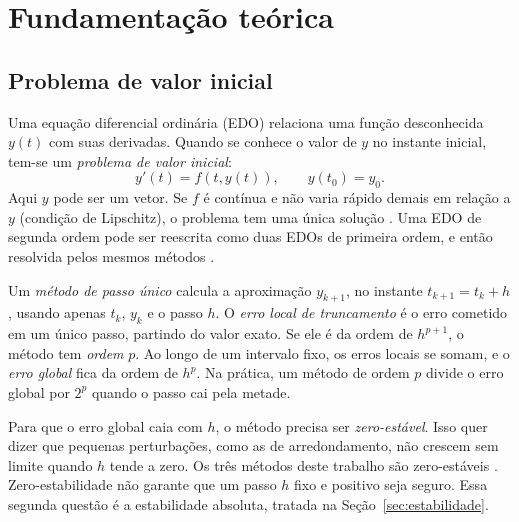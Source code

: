 \section{Fundamentação teórica}
\label{sec:teoria}

\subsection{Problema de valor inicial}

Uma equação diferencial ordinária (EDO) relaciona uma função desconhecida \(y(t)\) com suas derivadas. Quando se conhece o valor de \(y\) no instante inicial, tem-se um \emph{problema de valor inicial}:
\begin{equation}
y'(t) = f(t,y(t)), \qquad y(t_0)=y_0.
\label{eq:pvi}
\end{equation}
Aqui \(y\) pode ser um vetor. Se \(f\) é contínua e não varia rápido demais em relação a \(y\) (condição de Lipschitz), o problema tem uma única solução \cite{burden2008}. Uma EDO de segunda ordem pode ser reescrita como duas EDOs de primeira ordem, e então resolvida pelos mesmos métodos \cite[seção~10.4]{aquino2020}.

Um \emph{método de passo único} calcula a aproximação \(y_{k+1}\), no instante \(t_{k+1}=t_k+h\), usando apenas \(t_k\), \(y_k\) e o passo \(h\). O \emph{erro local de truncamento} é o erro cometido em um único passo, partindo do valor exato. Se ele é da ordem de \(h^{p+1}\), o método tem \emph{ordem} \(p\). Ao longo de um intervalo fixo, os erros locais se somam, e o \emph{erro global} fica da ordem de \(h^{p}\). Na prática, um método de ordem \(p\) divide o erro global por \(2^{p}\) quando o passo cai pela metade.

Para que o erro global caia com \(h\), o método precisa ser \emph{zero-estável}. Isso quer dizer que pequenas perturbações, como as de arredondamento, não crescem sem limite quando \(h\) tende a zero. Os três métodos deste trabalho são zero-estáveis \cite{burden2008}. Zero-estabilidade não garante que um passo \(h\) fixo e positivo seja seguro. Essa segunda questão é a estabilidade absoluta, tratada na Seção~\ref{sec:estabilidade}.

